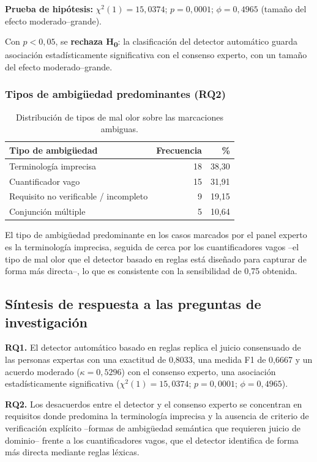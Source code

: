 \documentclass[journal,onecolumn]{IEEEtran}
\begin{document}
\textbf{Prueba de hipótesis:} $\chi^2(1) = 15{,}0374$; $p = 0{,}0001$;
$\phi = 0{,}4965$ (tamaño del efecto moderado--grande).

Con $p < 0{,}05$, se \textbf{rechaza H\textsubscript{0}}: la clasificación
del detector automático guarda asociación estadísticamente significativa
con el consenso experto, con un tamaño del efecto moderado--grande.

\subsubsection{Tipos de ambigüedad predominantes (RQ2)}

\begin{table}[H]
	\centering
	\caption{Distribución de tipos de mal olor sobre las marcaciones ambiguas.}
	\label{tab:tipos-ambiguedad}
	\begin{tabular}{@{}lrr@{}}
		\toprule
		\textbf{Tipo de ambigüedad} & \textbf{Frecuencia} & \textbf{\%} \\
		\midrule
		Terminología imprecisa & 18 & 38,30 \\
		Cuantificador vago & 15 & 31,91 \\
		Requisito no verificable / incompleto & 9 & 19,15 \\
		Conjunción múltiple & 5 & 10,64 \\
		\bottomrule
	\end{tabular}
\end{table}

El tipo de ambigüedad predominante en los casos marcados por el panel
experto es la terminología imprecisa, seguida de cerca por los
cuantificadores vagos --el tipo de mal olor que el detector basado en
reglas está diseñado para capturar de forma más directa--, lo que es
consistente con la sensibilidad de 0,75 obtenida.

\subsection{Síntesis de respuesta a las preguntas de investigación}
\label{sec:sintesis}

\textbf{RQ1.} El detector automático basado en reglas replica el juicio
consensuado de las personas expertas con una exactitud de 0,8033, una
medida F1 de 0,6667 y un acuerdo moderado ($\kappa=0{,}5296$) con el
consenso experto, una asociación estadísticamente significativa
($\chi^2(1)=15{,}0374$; $p=0{,}0001$; $\phi=0{,}4965$).

\textbf{RQ2.} Los desacuerdos entre el detector y el consenso experto se
concentran en requisitos donde predomina la terminología imprecisa y la
ausencia de criterio de verificación explícito --formas de ambigüedad
semántica que requieren juicio de dominio-- frente a los cuantificadores
vagos, que el detector identifica de forma más directa mediante reglas
léxicas.
\end{document}
